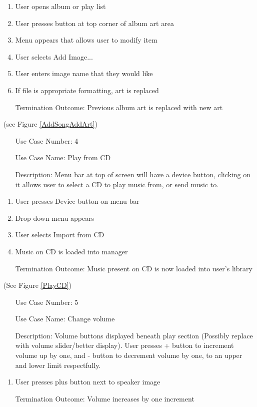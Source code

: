 \documentclass[10pt,conference,onecolumn,compsoc]{IEEEtran}
\begin{document}
\begin{enumerate}
\item User opens album or play list
\item User presses button at top corner of album art area
\item Menu appears that allows user to modify item
\item User selects Add Image...
\item User enters image name that they would like
\item If file is appropriate formatting, art is replaced
\item [Termination Outcome:] Previous album art is replaced with new art
\end{enumerate}

(see Figure \ref{AddSongAddArt})

\begin{itemize}
\item[Use Case Number:] 4
\item[Use Case Name:] Play from CD
\item[Description:] Menu bar at top of screen will have a device button, clicking on it allows user to select a CD to play music from, or send music to.
\end{itemize}

\begin{enumerate}
\item User presses Device button on menu bar
\item Drop down menu appears
\item User selects Import from CD
\item Music on CD is loaded into manager
\item [Termination Outcome:] Music present on CD is now loaded into user's library
\end{enumerate}

(See Figure \ref{PlayCD})

\begin{itemize}
\item[Use Case Number:] 5
\item[Use Case Name:] Change volume
\item[Description:] Volume buttons displayed beneath play section (Possibly replace with volume slider/better display). User presses + button to increment volume up by one, and - button to decrement volume by one, to an upper and lower limit respectfully.
\end{itemize}

\begin{enumerate}
\item User presses plus button next to speaker image
\item [Termination Outcome:] Volume increases by one increment
\end{enumerate}
\end{document}
